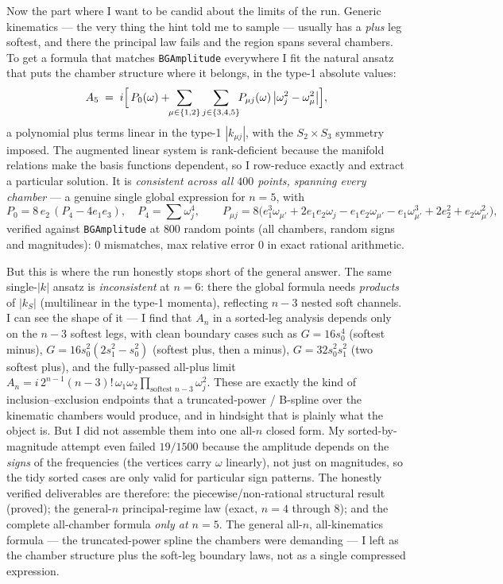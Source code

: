 \documentclass{article}
\begin{document}
Now the part where I want to be candid about the limits of the run. Generic
kinematics --- the very thing the hint told me to sample --- usually has a
\emph{plus} leg softest, and there the principal law fails and the region spans
several chambers. To get a formula that matches \texttt{BGAmplitude} everywhere I
fit the natural ansatz that puts the chamber structure where it belongs, in the
type-1 absolute values:
\[
A_5 \;=\; i\Bigl[\,P_0(\omega)+\!\!\sum_{\mu\in\{1,2\}}\sum_{j\in\{3,4,5\}}\!\!
P_{\mu j}(\omega)\,\bigl|\omega_j^2-\omega_\mu^2\bigr|\Bigr],
\]
a polynomial plus terms linear in the type-1 $|k_{\mu j}|$, with the $S_2\times
S_3$ symmetry imposed. The augmented linear system is rank-deficient because the
manifold relations make the basis functions dependent, so I row-reduce exactly and
extract a particular solution. It is \emph{consistent across all $400$ points,
spanning every chamber} --- a genuine single global expression for $n=5$, with
\[
P_0=8\,e_2\,(P_4-4e_1e_3),\quad P_4=\textstyle\sum\omega_j^4,\qquad
P_{\mu j}=8\bigl(e_1^3\omega_{\mu'}+2e_1e_2\omega_j-e_1e_2\omega_{\mu'}
-e_1\omega_{\mu'}^3+2e_2^2+e_2\omega_{\mu'}^2\bigr),
\]
verified against \texttt{BGAmplitude} at $800$ random points (all chambers, random
signs and magnitudes): $0$ mismatches, max relative error $0$ in exact rational
arithmetic.

But this is where the run honestly stops short of the general answer. The same
single-$|k|$ ansatz is \emph{inconsistent} at $n=6$: there the global formula
needs \emph{products} of $|k_S|$ (multilinear in the type-1 momenta), reflecting
$n-3$ nested soft channels. I can see the shape of it --- I find that $A_n$ in a
sorted-leg analysis depends only on the $n-3$ softest legs, with clean boundary
cases such as $G=16s_0^4$ (softest minus), $G=16s_0^2(2s_1^2-s_0^2)$ (softest plus,
then a minus), $G=32s_0^2s_1^2$ (two softest plus), and the fully-passed all-plus
limit $A_n=i\,2^{n-1}(n-3)!\,\omega_1\omega_2\prod_{\text{softest }n-3}\omega_j^2$.
These are exactly the kind of inclusion--exclusion endpoints that a truncated-power
/ B-spline over the kinematic chambers would produce, and in hindsight that is
plainly what the object is. But I did not assemble them into one all-$n$ closed
form. My sorted-by-magnitude attempt even failed $19/1500$ because the amplitude
depends on the \emph{signs} of the frequencies (the vertices carry $\omega$
linearly), not just on magnitudes, so the tidy sorted cases are only valid for
particular sign patterns. The honestly verified deliverables are therefore: the
piecewise/non-rational structural result (proved); the general-$n$ principal-regime
law (exact, $n=4$ through $8$); and the complete all-chamber formula \emph{only at
$n=5$}. The general all-$n$, all-kinematics formula --- the truncated-power spline
the chambers were demanding --- I left as the chamber structure plus the
soft-leg boundary laws, not as a single compressed expression.
\end{document}
